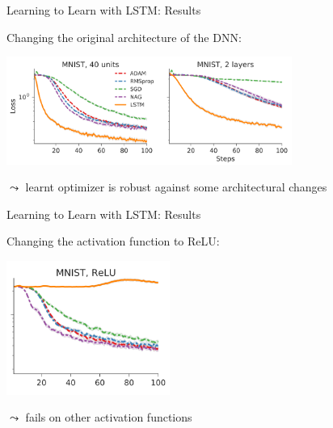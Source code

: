 \begin{frame}[c]{Learning to Learn with LSTM: Results }

Changing the original architecture of the DNN:
\smallskip

\centering
\includegraphics[width=0.7\textwidth]{images/l2l_mnist_okchange}

$\leadsto$ learnt optimizer is robust against some architectural changes

\end{frame}
\begin{frame}[c]{Learning to Learn with LSTM: Results\newline {}}

Changing the activation function to ReLU:
\smallskip

\centering
\includegraphics[width=0.4\textwidth]{images/l2l_mnist_relu}

$\leadsto$ fails on other activation functions

\end{frame}
